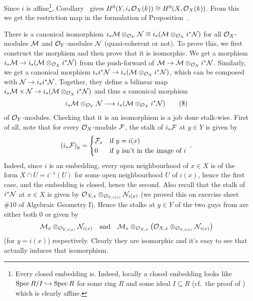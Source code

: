 \documentclass[a4paper,parskip=half,numbers=enddot, DIV=12]{scrreprt}
\begin{document}
\begin{rem}
\begin{alphanumerate}
		Since $i$ is affine\footnote{Every closed embedding is. Indeed, locally a closed embedding looks like $\Spec R/I\monomorphism\Spec R$ for some ring $R$ and some ideal $I\subseteq R$ (cf.\ the proof of \cite[Proposition~1.5.3]{alggeo1}) which is clearly affine.}, Corollary~ gives $H^0(Y,i_*\mathcal{O}_X(k))\cong H^0(X,\mathcal{O}_X(k))$. From this we get the restriction map in the formulation of Proposition~.
		\item There is a canonical isomorphism $i_*\mathcal{M}\otimes_{\mathcal{O}_Y}\mathcal{N}\cong  i_*(\mathcal{M}\otimes_{\mathcal{O}_X}i^*\mathcal{N})$ for all $\mathcal{O}_X$-modules $\mathcal{M}$ and $\mathcal{O}_Y$-modules $\mathcal{N}$ (quasi-coherent or not). To prove this, we first construct the morphism and then prove that it is isomorphic. We get a morphism $i_*\Mm\morphism i_*(\Mm\otimes_{\Oo_X}i^*\Nn)$ from the push-forward of $\Mm\morphism\Mm\otimes_{\Oo_X}i^*\Nn$. Similarly, we get a canonical morphism $i_*i^*\Nn\morphism i_*(\Mm\otimes_{\Oo_X}i^*\Nn)$, which can be composed with $\Nn\morphism i_*i^*\Nn$. Together, they define a bilinear map $i_*\Mm\times \Nn\morphism i_*(\Mm\otimes_{\Oo_X}i^*\Nn)$ and thus a canonical morphism
		\begin{align}\lbl{eq:i_*Iso}
			i_*\Mm\otimes_{\Oo_Y}\Nn\morphism i_*(\Mm\otimes_{\Oo_X}i^*\Nn)\tag{\$}
		\end{align}
		of $\mathcal{O}_Y$-modules. Checking that it is an isomorphism is a job done stalk-wise. First of all, note that for every $\mathcal{O}_X$-module $\mathcal{F}$, the stalk of $i_*\mathcal{F}$ at $y\in Y$ is given by
		\begin{align*}
			(i_*\mathcal{F})_y=\begin{cases}
				\mathcal{F}_x &\text{if }y=i(x)\\
				0 & \text{if }y\text{ isn't in the image of }i
			\end{cases}\;.
		\end{align*}
		Indeed, since $i$ is an embedding, every open neighbourhood of $x\in X$ is of the form $X\cap U=i^{-1}(U)$ for some open neighbourhood $U$ of $i(x)$, hence the first case, and the embedding is closed, hence the second. Also recall that the stalk of $i^*\mathcal{N}$ at $x\in X$ is given by $\mathcal{O}_{X,x}\otimes_{\mathcal{O}_{Y,i(x)}}\mathcal{N}_{i(x)}$ (we proved this on exercise sheet \#10 of Algebraic Geometry I). Hence the stalks at $y\in Y$ of the two guys from  are either both $0$ or given by 
		\begin{align*}
			\mathcal{M}_x\otimes_{\mathcal{O}_{Y,i(x)}}\mathcal{N}_{i(x)}\quad\text{and}\quad \mathcal{M}_x\otimes_{\mathcal{O}_{X,x}}\left(\mathcal{O}_{X,x}\otimes_{\mathcal{O}_{Y,i(x)}}\mathcal{N}_{i(x)}\right)
		\end{align*}
		(for $y=i(x)$) respectively. Clearly they are isomorphic and it's easy to see that  actually induces that isomorphism.
	\end{alphanumerate}
\end{rem}
\end{document}
